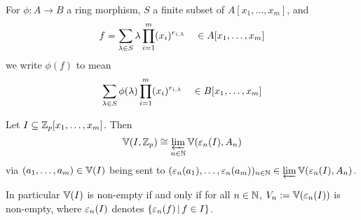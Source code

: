 \begin{nttn}
    For $\phi: A \to B$ a ring morphism,
    $S$ a finite subset of $A[x_1, \dots, x_m]$,
    and
    \[f = \sum_{\lambda \in S} \lambda 
    \prod_{i = 1}^m (x_i)^{r_{i,\lambda}} 
    \quad \in A [x_1, \dots, x_m]\]
    we write $\phi (f)$ to mean 
    \[\sum_{\lambda \in S} \phi(\lambda) 
    \prod_{i = 1}^m (x_i)^{r_{i,\lambda}} 
    \quad \in B [x_1, \dots, x_m]\]
\end{nttn}

\begin{prop}
    Let $I \subseteq \mathbb{Z}_p [x_1, \dots, x_m]$.
    Then \[\mathbb{V}(I,\mathbb{Z}_p) \cong \varprojlim_{n \in \mathbb{N}} \mathbb{V}(\varepsilon_n(I),A_n)\]
    via $(a_1,\dots, a_m) \in \mathbb{V}(I)$
    being sent to
    $(\varepsilon_n(a_1),\dots, \varepsilon_n(a_m))_{n\in\mathbb{N}} \in \varprojlim \mathbb{V}(\varepsilon_n(I),A_n)$.

    In particular $\mathbb{V}(I)$ is non-empty
    if and only if for all $n \in \mathbb{N}$, 
    $V_n := \mathbb{V} (\varepsilon_n(I))$ is non-empty,
    where $\varepsilon_n(I)$ denotes $\left\{\varepsilon_n(f) \,|\, f \in I\right\}$.
\end{prop}
